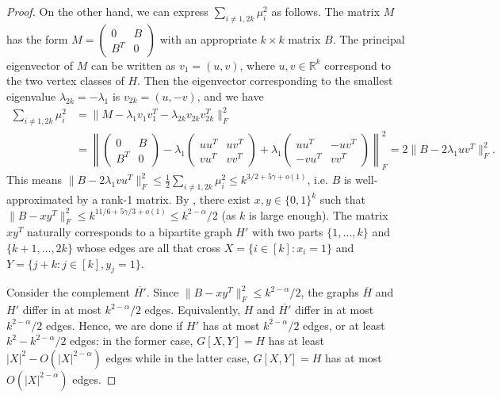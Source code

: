 \documentclass[11pt]{article}
\theoremstyle{plain}
\theoremstyle{definition}
\begin{document}
\begin{proof}
On the other hand, we can express $\sum_{i\neq 1, 2k}\mu_i^2$ as follows. The matrix $M$ has the form $M=\begin{pmatrix}0 & B \\ B^T & 0\end{pmatrix}$ with an appropriate $k\times k$ matrix $B$. The principal eigenvector of $M$ can be written as $v_1=(u,v)$, where $u,v\in\mathbb{R}^k$ correspond to the two vertex classes of $H$. Then the eigenvector corresponding to the smallest eigenvalue $\lambda_{2k}=-\lambda_1$ is $v_{2k}=(u,-v)$, and we have
\begin{align*}
    \sum_{i\neq 1,2k}\mu_i^2
    &=\big\|M-\lambda_1v_1v_1^T-\lambda_{2k}v_{2k}v_{2k}^T \big\|_F^2\\
    &=\left\|\begin{pmatrix} 0 & B \\ B^T & 0\end{pmatrix}
        -\lambda_1\begin{pmatrix} uu^T & uv^T \\ vu^T & vv^T\end{pmatrix}
        +\lambda_1\begin{pmatrix} uu^T & -uv^T \\ -vu^T & vv^T\end{pmatrix}\right\|_F^2
    =2\big\|B-2\lambda_1uv^T \big\|_F^2.
\end{align*}
This means $\big\|B-2\lambda_1vu^T \big\|_F^2\le \frac{1}{2}\sum_{i\neq 1,2k}\mu_i^2 \le  k^{3/2+5\gamma+o(1)}$, i.e. $B$ is well-approximated by a rank-1 matrix.
By , there exist $x,y\in \{0,1\}^k$ such that $\|B-xy^T\|_F^2 \le k^{11/6+5\gamma/3+o(1)} \leq k^{2-\alpha}/2$ (as $k$ is large enough). 
The matrix $xy^T$ naturally corresponds to a bipartite graph $H'$ with two parts $\{1,\dots,k\}$ and $\{k+1,\dots,2k\}$ whose edges are all that cross $X=\{i\in [k]: x_i=1\}$ and $Y=\{j+k: j\in [k], y_j=1\}$.

Consider the complement $\overline{H'}$. 
Since $\|B-xy^T\|_F^2\leq k^{2-\alpha}/2$, the graphs $\overline{H}$ and $H'$ differ in at most $k^{2-\alpha}/2$ edges. Equivalently, $H$ and $\overline{H'}$ differ in at most $k^{2-\alpha}/2$ edges. 
Hence, we are done if $H'$ has at most $k^{2-\alpha}/2$ edges, or at least $k^2-k^{2-\alpha}/2$ edges: in the former case, $G[X,Y]=H$ has at least $|X|^2-O(|X|^{2-\alpha})$ edges while in the latter case, $G[X,Y]=H$ has at most $O(|X|^{2-\alpha})$ edges.


\end{proof}
\end{document}
